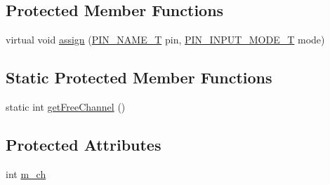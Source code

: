 \subsection*{Protected Member Functions}
\begin{DoxyCompactItemize}
\item 
virtual void \hyperlink{class_c_pin_i_n_t_a762631f4e29ba2f09257af8892f8777e}{assign} (\hyperlink{group___peripheral_ga65a2241721e4acb573e0c3fe29ac432f}{P\-I\-N\-\_\-\-N\-A\-M\-E\-\_\-\-T} pin, \hyperlink{group___peripheral_gad5705547b72a4480dc714447b3bbfb64}{P\-I\-N\-\_\-\-I\-N\-P\-U\-T\-\_\-\-M\-O\-D\-E\-\_\-\-T} mode)
\end{DoxyCompactItemize}
\subsection*{Static Protected Member Functions}
\begin{DoxyCompactItemize}
\item 
static int \hyperlink{class_c_pin_i_n_t_ac638835b5fd1ca3f7c29af36677e2b0a}{get\-Free\-Channel} ()
\end{DoxyCompactItemize}
\subsection*{Protected Attributes}
\begin{DoxyCompactItemize}
\item 
int \hyperlink{class_c_pin_i_n_t_a563b913b2126f003c0e1e2f3400a2ed2}{m\-\_\-ch}
\end{DoxyCompactItemize}



